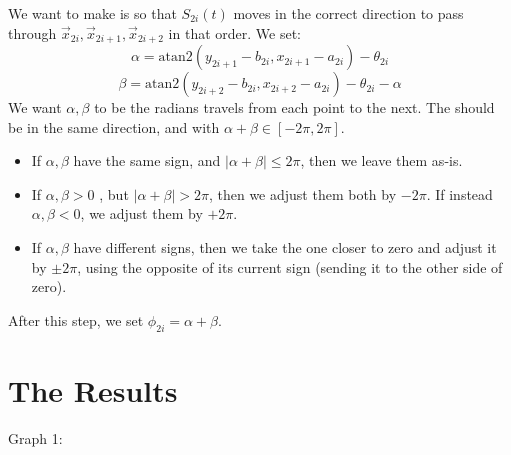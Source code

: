 \documentclass[11pt]{article}
\begin{document}
We want to make is so that $S_{2i}(t)$ moves in the correct direction to pass through \(\vec x_{2i}, \vec x_{2i+1}, \vec x_{2i+2}\) in that order. We set: 
$$ \alpha = \text{atan2}(y_{2i+1} - b_{2i}, x_{2i+1} - a_{2i}) - \theta_{2i} $$
$$ \beta = \text{atan2}(y_{2i+2} - b_{2i}, x_{2i+2} - a_{2i}) - \theta_{2i}  - \alpha$$
We want $\alpha, \beta$ to be the radians travels from each point to the next. The should be in the same direction, and with $\alpha + \beta \in [-2\pi, 2\pi]$.
\begin{itemize}
	\item If $\alpha, \beta$ have the same sign, and $|\alpha + \beta| \le 2\pi$, then we leave them as-is.
	\item If $\alpha, \beta > 0$ , but $|\alpha + \beta| > 2\pi$, then we adjust them both by \(-2\pi\). If instead $\alpha, \beta < 0$, we adjust them by \(+ 2\pi\).
	\item If $\alpha, \beta$ have different signs, then we take the one closer to zero and adjust it by $\pm 2\pi$, using the opposite of its current sign (sending it to the other side of zero).
\end{itemize}

After this step, we set $\phi_{2i} = \alpha + \beta$.



\section*{The Results}




Graph 1:
\begin{center}
\end{center}
\end{document}
